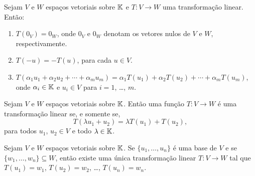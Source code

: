 \documentclass{beamer}
\begin{document}
\begin{frame}
    \begin{lema}
        Sejam $V$ e $W$ espaços vetoriais sobre $\mathbb{K}$  e $T \colon V \to W$ uma transformação linear.  Então:
        \begin{enumerate}[label={\roman*})]\label{transformacao_linear_propriedades_basicas}
            \item $T(0_V)  = 0_W$,  onde $0_V$ e $0_W$  denotam os vetores nulos de $V$ e $W$, respectivamente.

            \vspace*{1cm}

            \item $T(-u)  = -T(u)$,  para cada $u \in V$.

            \vspace{1cm}

            \item $T(\alpha_1u_1  + \alpha_2u_2  + \cdots +  \alpha_mu_m)  = \alpha_1 T(u_1)  + \alpha_2 T(u_2)  + \cdots + \alpha_m T(u_m)$,  onde $\alpha_i \in \mathbb{K}$ e $u_i \in V$ para $i = 1$, \dots, $m$.
        \end{enumerate}
    \end{lema}
\end{frame}

\begin{frame}
    \begin{lema}
        Sejam $V$ e $W$ espaços vetoriais sobre $\mathbb{K}$.  Então uma função $T \colon V \to W$  é uma transformação linear se, e somente se,
        \[
        T(\lambda u_1  + u_2)  = \lambda  T(u_1)  + T(u_2),
        \]
        para todos $u_1$, $u_2 \in V$  e todo $\lambda \in \mathbb{K}$.
    \end{lema}
\end{frame}

\begin{frame}
    \begin{teorema}\label{existencia_de_transformacao_unica_dado_valores}
        Sejam $V$ e $W$ espaços vetoriais sobre $\mathbb{K}$.  Se $\{u_1,  \dots,  u_n\}$  é uma base de $V$  e se $\{w_1,  \dots,  w_n\} \subseteq W$,  então existe uma única transformação linear  $T \colon V \to W$  tal que $T(u_1) = w_1$,  $T(u_2) = w_2$,  \dots, $T(u_n) = w_n$.
    \end{teorema}
\end{frame}
\end{document}
